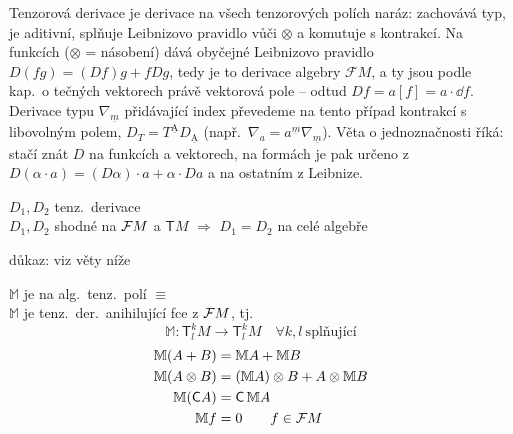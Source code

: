 \begin{vysvetleni}
Tenzorová derivace je  derivace na všech tenzorových polích naráz: zachovává typ, je aditivní, splňuje Leibnizovo pravidlo vůči $\otimes$ a komutuje s kontrakcí. Na funkcích ($\otimes$ = násobení) dává obyčejné Leibnizovo pravidlo $D(fg)=(Df)g+fDg$, tedy je to derivace algebry $\mathcal FM$, a ty jsou podle kap.\ o tečných vektorech právě vektorová pole -- odtud $Df=a[f]=a\cdot\dd f$. Derivace typu $\nabla_{\underline m}$ přidávající index převedeme na tento případ kontrakcí s libovolným polem, $D_T=T^{\underline{\mathrm A}}D_{\underline{\mathrm A}}$ (např.\ $\nabla_a=a^{\underline m}\nabla_{\underline m}$). Věta o jednoznačnosti říká: stačí znát $D$ na funkcích a vektorech, na formách je pak určeno z $D(\alpha\cdot a)=(D\alpha)\cdot a+\alpha\cdot Da$ a na ostatním z Leibnize.
\end{vysvetleni}

\begin{veta}[T:]
$D_1, D_2$ tenz.\ derivace \\
$D_1, D_2$ shodné na $\mathcal{F} M$ a $\mathsf{T}M$ \quad $\Rightarrow$ \quad $D_1 = D_2$ na celé algebře
\end{veta}
\quad důkaz: viz věty níže

\providecommand{\gmIpM}{\mathbb{M}}

\begin{definice}[Pseudoderivace]
$\gmIpM$ je  na alg.\ tenz.\ polí $\equiv$ \\
$\gmIpM$ je tenz.\ der.\ anihilující fce z $\mathcal{F} M$, tj.
\[
  \gmIpM: \mathsf{T}^k_lM\to\mathsf{T}^k_lM \quad \forall k,l \ \text{splňující}
\]
\[
  \begin{aligned}
    \gmIpM(A+B) &= \gmIpM A + \gmIpM B \\
    \gmIpM(A\otimes B) &= (\gmIpM A)\otimes B + A\otimes\gmIpM B \\
    \gmIpM(\mathsf{C}A) &= \mathsf{C}\,\gmIpM A \\
    \gmIpM f &= 0 \qquad f\in\gmIpF M
  \end{aligned}
\]
\end{definice}

